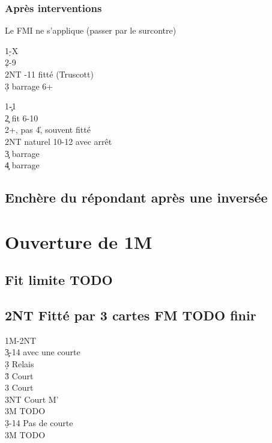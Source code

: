 \documentclass[a4paper]{article}
\begin{document}
\subsubsection{Après interventions}

Le FMI ne s'applique (passer par le surcontre)

\begin{bidtable}
1\d-X\+\\
2\d {}-9\\
2NT -11 fitté (Truscott)\\
3\d \> barrage 6+\-
\end{bidtable}

\begin{bidtable}
1\c-1\s\+\\
2\c \> fit 6-10\\
2\s {}+, pas 4\h , souvent fitté \c \\
2NT \> naturel 10-12 avec arrêt\\
3\c \> barrage\\
4\c \> barrage\-
\end{bidtable}

\subsection{Enchère du répondant après une inversée}

\section{Ouverture de 1M}

\subsection{Fit limite TODO}

\subsection{2NT Fitté par 3 cartes FM TODO finir}

\begin{bidtable}
1M-2NT\\
3\c {}-14 avec une courte\+\\
3\d \> Relais\+\\
3\h \> Court \c \\
3\s \> Court \d \\
3NT \> Court M'\-\\
3M \> TODO\-\\
3\d {}-14 Pas de courte\+\\
3M \> TODO\-
\end{bidtable}
\end{document}
